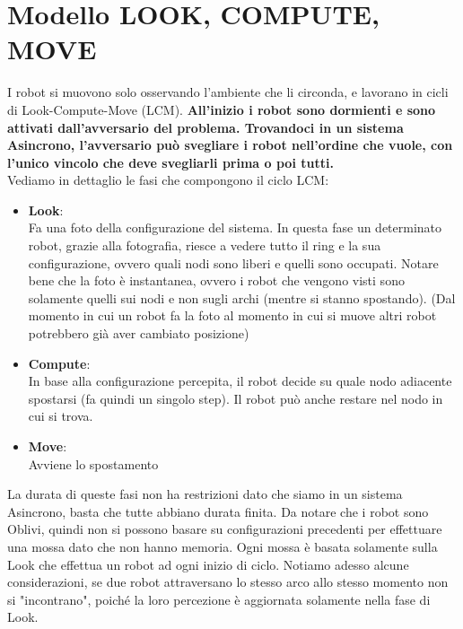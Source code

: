 \section{Modello LOOK, COMPUTE, MOVE}
I robot si muovono solo osservando l'ambiente che li circonda, e lavorano in cicli di Look-Compute-Move (LCM). \textbf{All'inizio i robot sono dormienti e sono attivati dall'avversario del problema. Trovandoci in un sistema Asincrono, l'avversario può svegliare i robot nell'ordine che vuole, con l'unico vincolo che deve svegliarli prima o poi tutti.}\\
Vediamo in dettaglio le fasi che compongono il ciclo LCM:
\begin{itemize}
  \item \textbf{Look}:\\
  Fa una foto della configurazione del sistema. In questa fase un determinato robot, grazie alla fotografia, riesce a vedere tutto il ring e la sua configurazione, ovvero quali nodi sono liberi e quelli sono occupati. Notare bene che la foto è instantanea, ovvero i robot che vengono visti sono solamente quelli sui nodi e non sugli archi (mentre si stanno spostando). (Dal momento in cui un robot fa la foto al momento in cui si muove altri robot potrebbero già aver cambiato posizione)
  
  \item \textbf{Compute}:\\
  In base alla configurazione percepita, il robot decide su quale nodo adiacente spostarsi (fa quindi un singolo step). Il robot può anche restare nel nodo in cui si trova.
  
  \item \textbf{Move}: \\
  Avviene lo spostamento
\end{itemize}
La durata di queste fasi non ha restrizioni dato che siamo in un sistema Asincrono, basta che tutte abbiano durata finita. Da notare che i robot sono Oblivi, quindi non si possono basare su configurazioni precedenti per effettuare una mossa dato che non hanno memoria. Ogni mossa è basata solamente sulla Look che effettua un robot ad ogni inizio di ciclo. Notiamo adesso alcune considerazioni, se due robot attraversano lo stesso arco allo stesso momento non si "incontrano", poiché la loro percezione è aggiornata solamente nella fase di Look.\\

